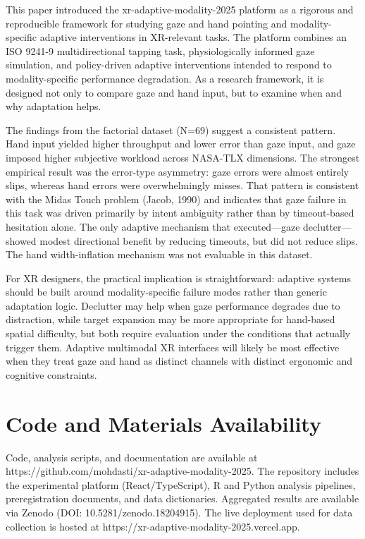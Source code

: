 \documentclass[
  11pt,
  11pt,
  letterpaper]{article}
\begin{document}
This paper introduced the xr-adaptive-modality-2025 platform as a
rigorous and reproducible framework for studying gaze and hand pointing
and modality-specific adaptive interventions in XR-relevant tasks. The
platform combines an ISO 9241-9 multidirectional tapping task,
physiologically informed gaze simulation, and policy-driven adaptive
interventions intended to respond to modality-specific performance
degradation. As a research framework, it is designed not only to compare
gaze and hand input, but to examine when and why adaptation helps.

The findings from the factorial dataset (N=69) suggest a consistent
pattern. Hand input yielded higher throughput and lower error than gaze
input, and gaze imposed higher subjective workload across NASA-TLX
dimensions. The strongest empirical result was the error-type asymmetry:
gaze errors were almost entirely slips, whereas hand errors were
overwhelmingly misses. That pattern is consistent with the Midas Touch
problem (Jacob, 1990) and indicates that gaze failure in this task was
driven primarily by intent ambiguity rather than by timeout-based
hesitation alone. The only adaptive mechanism that executed---gaze
declutter---showed modest directional benefit by reducing timeouts, but
did not reduce slips. The hand width-inflation mechanism was not
evaluable in this dataset.

For XR designers, the practical implication is straightforward: adaptive
systems should be built around modality-specific failure modes rather
than generic adaptation logic. Declutter may help when gaze performance
degrades due to distraction, while target expansion may be more
appropriate for hand-based spatial difficulty, but both require
evaluation under the conditions that actually trigger them. Adaptive
multimodal XR interfaces will likely be most effective when they treat
gaze and hand as distinct channels with distinct ergonomic and cognitive
constraints.

\section{Code and Materials
Availability}\label{code-and-materials-availability}

Code, analysis scripts, and documentation are available at
https://github.com/mohdasti/xr-adaptive-modality-2025. The repository
includes the experimental platform (React/TypeScript), R and Python
analysis pipelines, preregistration documents, and data dictionaries.
Aggregated results are available via Zenodo (DOI:
10.5281/zenodo.18204915). The live deployment used for data collection
is hosted at https://xr-adaptive-modality-2025.vercel.app.
\end{document}
